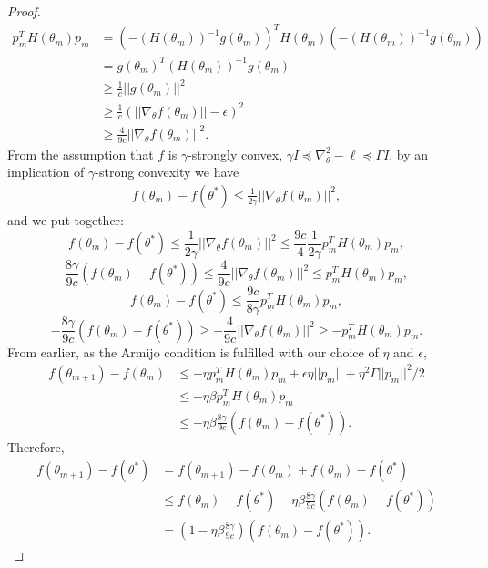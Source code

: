 \begin{proof}
\begin{align}
    p_m^TH(\theta_m)p_m &= (-(H(\theta_m))^{-1}g(\theta_m))^TH(\theta_m)(-(H(\theta_m))^{-1}g(\theta_m)) \\
    &= g(\theta_m)^T(H(\theta_m))^{-1}g(\theta_m) \\
    &\geq \frac{1}{c}||g(\theta_m)||^2 \\
    &\geq \frac{1}{c}(||\nabla_\theta f(\theta_m)|| - \epsilon)^2 \\
    &\geq \frac{4}{9c}||\nabla_\theta f(\theta_m)||^2.
\end{align}
From the assumption that $f$ is $\gamma$-strongly convex, $\gamma I \preceq \nabla_\theta^2 -\ell \preceq \Gamma I$, by an implication of $\gamma$-strong convexity we have
\begin{align}
    f(\theta_m) - f(\theta^*) \leq \frac{1}{2\gamma}||\nabla_\theta f(\theta_m)||^2,
\end{align}
and we put together:
\begin{equation}
    f(\theta_m) - f(\theta^*) \leq \frac{1}{2\gamma}||\nabla_\theta f(\theta_m)||^2 \leq \frac{9c}{4}\frac{1}{2\gamma}p_m^TH(\theta_m)p_m,
\end{equation}
\begin{equation}
    \frac{8\gamma}{9c}(f(\theta_m) - f(\theta^*)) \leq \frac{4}{9c}||\nabla_\theta f(\theta_m)||^2 \leq p_m^TH(\theta_m)p_m,
\end{equation}
\begin{equation}
    f(\theta_m) - f(\theta^*) \leq \frac{9c}{8\gamma}p_m^TH(\theta_m)p_m,
\end{equation}
\begin{equation}
    -\frac{8\gamma}{9c}(f(\theta_m) - f(\theta^*)) \geq -\frac{4}{9c}||\nabla_\theta f(\theta_m)||^2 \geq -p_m^TH(\theta_m)p_m.
\end{equation}
From earlier, as the Armijo condition is fulfilled with our choice of $\eta$ and $\epsilon$,
\begin{align}
    f(\theta_{m+1})-f(\theta_m) &\leq -\eta p_m^TH(\theta_m)p_m + \epsilon\eta||p_m|| + \eta^2 \Gamma ||p_m||^2 / 2 \\
    &\leq -\eta\beta p_m^TH(\theta_m)p_m \\
    &\leq -\eta\beta\frac{8\gamma}{9c}(f(\theta_m) - f(\theta^*)).
\end{align}
Therefore,
\begin{align}
    f(\theta_{m+1}) - f(\theta^*) 
    &= f(\theta_{m+1})-f(\theta_m)+f(\theta_m)- f(\theta^*) \\
    &\leq f(\theta_m)- f(\theta^*) -\eta\beta\frac{8\gamma}{9c}(f(\theta_m) - f(\theta^*)) \\
    &= (1-\eta\beta\frac{8\gamma}{9c})(f(\theta_m) - f(\theta^*)).
\end{align}

\end{proof}
